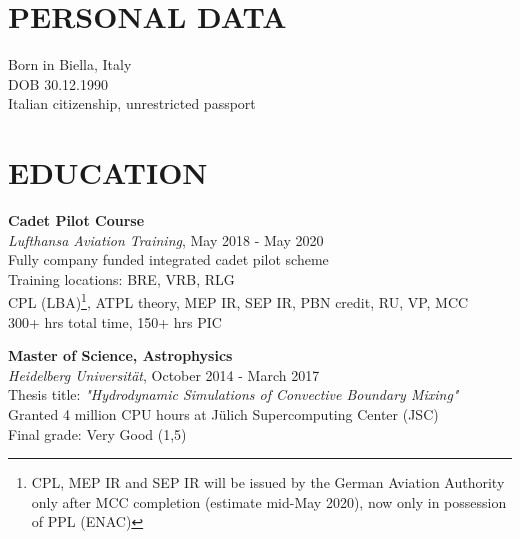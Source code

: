\documentclass[margin]{res}
\begin{document}
\begin{resume}


\section{PERSONAL DATA}
Born in Biella, Italy\\
DOB 30.12.1990\\
Italian citizenship, unrestricted passport


\section{EDUCATION}

\textbf{Cadet Pilot Course}\\
{\sl Lufthansa Aviation Training}, May 2018 - May 2020\\
Fully company funded integrated cadet pilot scheme\\
Training locations: BRE, VRB, RLG\\
CPL (LBA)\footnote{CPL, MEP IR and SEP IR will be issued by the German Aviation Authority only after MCC completion (estimate mid-May 2020), now only in possession of PPL (ENAC)}, ATPL theory, MEP IR, SEP IR, PBN credit, RU, VP, MCC\\
300+ hrs total time, 150+ hrs PIC

\textbf{Master of Science, Astrophysics}\\
{\sl Heidelberg Universität}, October 2014 - March 2017\\
Thesis title: \textit{"Hydrodynamic Simulations of Convective Boundary Mixing"}\\
Granted 4 million CPU hours at Jülich Supercomputing Center (JSC)\\
\hfill Final grade: Very Good (1,5)


\end{resume}
\end{document}
